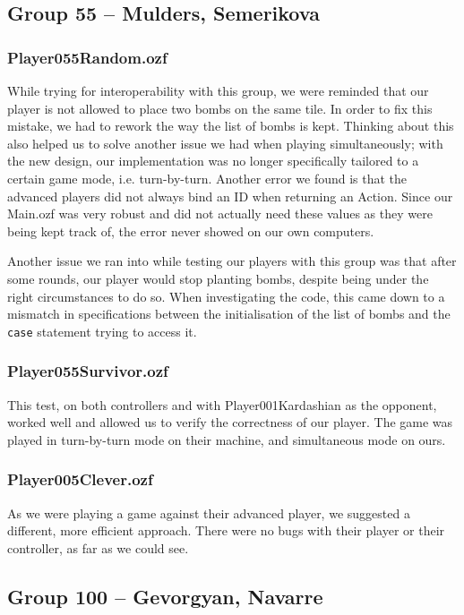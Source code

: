 \documentclass[12pt,journal]{IEEEtran}
\newcommand{\ntt}{\normalfont\ttfamily}
\newcommand{\fn}[1]{{\protect\ntt#1}}
\begin{document}
\subsection{Group 55 -- Mulders, Semerikova}
\subsubsection{\fn{Player055Random.ozf}}
While trying for interoperability with this group, we were reminded that our player is not allowed to place two bombs on the same tile.
In order to fix this mistake, we had to rework the way the list of bombs is kept.
Thinking about this also helped us to solve another issue we had when playing simultaneously; with the new design, our implementation was no longer specifically tailored to a certain game mode, i.e. turn-by-turn.
Another error we found is that the advanced players did not always bind an ID when returning an Action.
Since our \fn{Main.ozf} was very robust and did not actually need these values as they were being kept track of, the error never showed on our own computers.

Another issue we ran into while testing our players with this group was that after some rounds, our player would stop planting bombs, despite being under the right circumstances to do so.
When investigating the code, this came down to a mismatch in specifications between the initialisation of the list of bombs and the \lstinline|case| statement trying to access it.

\subsubsection{\fn{Player055Survivor.ozf}}
This test, on both controllers and with \fn{Player001Kardashian} as the opponent, worked well and allowed us to verify the correctness of our player.
The game was played in turn-by-turn mode on their machine, and simultaneous mode on ours.

\subsubsection{\fn{Player005Clever.ozf}}
As we were playing a game against their advanced player, we suggested a different, more efficient approach.
There were no bugs with their player or their controller, as far as we could see.

\subsection{Group 100 -- Gevorgyan, Navarre}
\end{document}
